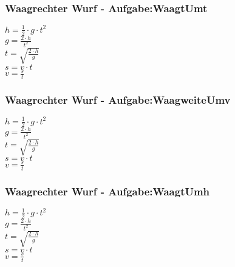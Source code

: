 \subsubsection{Waagrechter Wurf - Aufgabe:WaagtUmt} 
\begin{minipage}{0.45\textwidth} 
$ h = \frac{1}{2}\cdot g\cdot t^{2} $\\ 
$ g = \frac{2\cdot h}{t^{2} } $\\ 
$ t = \sqrt{\frac{2\cdot h}{g}} $\\ 
$ s = v\cdot t $\\ 
$ v = \frac{s}{t} $\\ 
\end{minipage} 
\begin{minipage}{0.45\textwidth} 
 
\end{minipage} 
\subsubsection{Waagrechter Wurf - Aufgabe:WaagweiteUmv} 
\begin{minipage}{0.45\textwidth} 
$ h = \frac{1}{2}\cdot g\cdot t^{2} $\\ 
$ g = \frac{2\cdot h}{t^{2} } $\\ 
$ t = \sqrt{\frac{2\cdot h}{g}} $\\ 
$ s = v\cdot t $\\ 
$ v = \frac{s}{t} $\\ 
\end{minipage} 
\begin{minipage}{0.45\textwidth} 
 
\end{minipage} 
\subsubsection{Waagrechter Wurf - Aufgabe:WaagtUmh} 
\begin{minipage}{0.45\textwidth} 
$ h = \frac{1}{2}\cdot g\cdot t^{2} $\\ 
$ g = \frac{2\cdot h}{t^{2} } $\\ 
$ t = \sqrt{\frac{2\cdot h}{g}} $\\ 
$ s = v\cdot t $\\ 
$ v = \frac{s}{t} $\\ 
\end{minipage} 
\begin{minipage}{0.45\textwidth} 
 
\end{minipage} 
